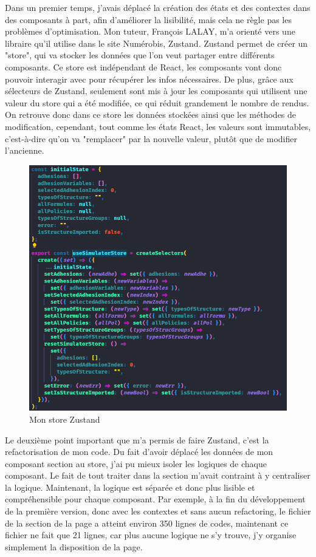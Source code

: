 \documentclass[a4paper,12pt]{report}
\begin{document}
Dans un premier temps, j'avais déplacé la création des états et des contextes dans des composants à part, afin d'améliorer la lisibilité, mais cela ne règle pas les problèmes d'optimisation. Mon tuteur, François LALAY, m'a orienté vers une libraire qu'il utilise dans le site Numérobis, Zustand. Zustand permet de créer un "store", qui va stocker les données que l'on veut partager entre différents composants. Ce store est indépendant de React, les composants vont donc pouvoir interagir avec pour récupérer les infos nécessaires. De plus, grâce aux sélecteurs de Zustand, seulement sont mis à jour les composants qui utilisent une valeur du store qui a été modifiée, ce qui réduit grandement le nombre de rendus. On retrouve donc dans ce store les données stockées ainsi que les méthodes de modification, cependant, tout comme les états React, les valeurs sont immutables, c'est-à-dire qu'on va "remplacer" par la nouvelle valeur, plutôt que de modifier l'ancienne.

\begin{figure}[H]
    \centering
    \includegraphics[scale=0.4]{storeZustand.png}
    \caption{Mon store Zustand}
    \label{fig:store-zustand}
\end{figure}

Le deuxième point important que m'a permis de faire Zustand, c'est la refactorisation de mon code. Du fait d'avoir déplacé les données de mon composant section au store, j'ai pu mieux isoler les logiques de chaque composant. Le fait de tout traiter dans la section m'avait contraint à y centraliser la logique. Maintenant, la logique est séparée et donc plus lisible et compréhensible pour chaque composant. Par exemple, à la fin du développement de la première version, donc avec les contextes et sans aucun refactoring, le fichier de la section de la page a atteint environ 350 lignes de codes, maintenant ce fichier ne fait que 21 lignes, car plus aucune logique ne s'y trouve, j'y organise simplement la disposition de la page.
\end{document}
